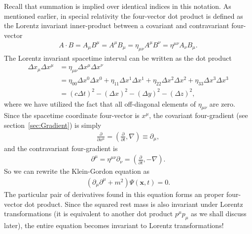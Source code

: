 \documentclass[titlepage,letterpaper,onecolumn,11pt,final]{report}
\numberwithin{equation}{section}
\numberwithin{figure}{section}
\begin{document}
Recall that summation is implied over identical indices in this notation. As mentioned earlier, in special relativity the four-vector dot product is defined as the Lorentz invariant inner-product between a covariant and contravariant four-vector
\begin{gather}
	\label{eq:dot_product_4v}
	A \cdot B = A_{\mu} B^{\mu} = A^{\mu} B_{\mu} = \eta_{\mu \nu} A^{\mu} B^{\nu} = \eta^{\mu \nu} A_{\nu} B_{\mu}.
\end{gather}
%
The Lorentz invariant spacetime interval can be written as the dot product
\begin{equation}
\begin{split}
	\Delta x_{\mu} \Delta x^{\mu} &= \eta_{\mu \nu} \Delta x^{\mu} \Delta x^{\nu} \\
	&= \eta_{00} \Delta x^{0} \Delta x^{0} + \eta_{11} \Delta x^{1} \Delta x^{1} + \eta_{22} \Delta x^{2} \Delta x^{2} + \eta_{33} \Delta x^{3} \Delta x^{3} \\
	&= (c \Delta t)^{2} - (\Delta x)^{2} -  (\Delta y)^{2} - (\Delta z)^{2} ,
\end{split}
\end{equation}
%
where we have utilized the fact that all off-diagonal elements of $\eta_{\mu \nu}$ are zero. Since the spacetime coordinate four-vector is $x^{\mu}$, the covariant four-gradient (see section~\ref{sec:Gradient}) is simply
\begin{gather}
	\label{eq:four_gradient}
	\frac{\partial}{\partial x^{\mu}} = \left( \frac{\partial}{\partial t} , \nabla \right) \equiv \partial_{\mu} ,
\end{gather}
%
and the contravariant four-gradient is 
\begin{gather}
	\label{eq:four_gradient_contra}
	\partial^{\mu} = \eta^{\mu \nu} \partial_{\nu} = \left( \frac{\partial}{\partial t} , - \nabla \right) .
\end{gather}
%
So we can rewrite the Klein-Gordon equation as
\begin{gather}
	\label{eq:Klein_gordon_compact}
	\left( \partial_{\mu} \partial^{\mu} + m^{2} \right) \Psi (\mathbf{x}, t) = 0 .
\end{gather}
%
The particular pair of derivatives found in this equation forms an proper four-vector dot product. Since the squared rest mass is also invariant under Lorentz transformations (it is equivalent to another dot product $p^{\mu} p_{\mu}$ as we shall discuss later), the entire equation becomes invariant to Lorentz transformations!
\end{document}
